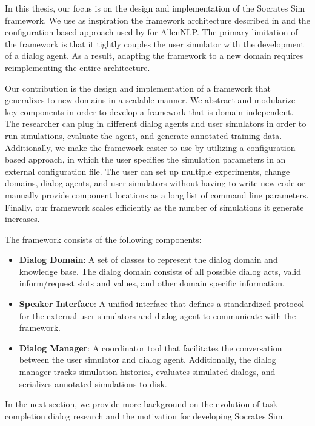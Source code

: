 In this thesis, our focus is on the design and implementation of the Socrates Sim framework. We use as inspiration the framework architecture described in \cite{li_usersim} and the configuration based approach used by \cite{Gardner_allennlp} for AllenNLP. The primary limitation of the \cite{li_end_to_end} framework is that it tightly couples the user simulator with the development of a dialog agent. As a result, adapting the framework to a new domain requires reimplementing the entire architecture. 

Our contribution is the design and implementation of a framework that generalizes to new domains in a scalable manner. We abstract and modularize key components in order to develop a framework that is domain independent. The researcher can plug in different dialog agents and user simulators in order to run simulations, evaluate the agent, and generate annotated training data. Additionally, we make the framework easier to use by utilizing a configuration based approach, in which the user specifies the simulation parameters in an external configuration file. The user can set up multiple experiments, change domains, dialog agents, and user simulators without having to write new code or manually provide component locations as a long list of command line parameters. Finally, our framework scales efficiently as the number of simulations it generate increases. 

The framework consists of the following components:
\begin{itemize}
	\item \textbf{Dialog Domain}: A set of classes to represent the dialog domain and knowledge base. The dialog domain consists of all possible dialog acts, valid inform/request slots and values, and other domain specific information. 
	\item \textbf{Speaker Interface}: A unified interface that defines a standardized protocol for the external user simulators and dialog agent to communicate with the framework. 
	\item \textbf{Dialog Manager}: A coordinator tool that facilitates the conversation between the user simulator and dialog agent. Additionally, the dialog manager tracks simulation histories, evaluates simulated dialogs, and serializes annotated simulations to disk.  
\end{itemize}

In the next section, we provide more background on the evolution of task-completion dialog research and the motivation for developing Socrates Sim. 


